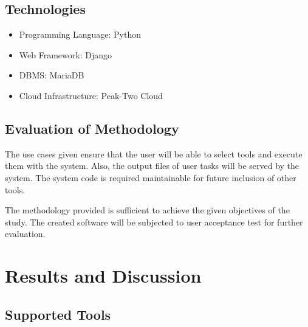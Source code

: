 	
\subsection{Technologies}
	\begin{itemize}
   		\item Programming Language: Python 
   		\item Web Framework: Django  
   		\item DBMS: MariaDB  
   		\item Cloud Infrastructure: Peak-Two Cloud 
	\end{itemize}	
	
\subsection{Evaluation of Methodology}

The use cases given ensure that the user will be able to select tools and execute them with the system. Also, the output files of user tasks will be served by the system. The system code is required maintainable for future inclusion of other tools.  

The methodology provided is sufficient to achieve the given objectives of the study. The created software will be subjected to user acceptance test for further evaluation. 

\section{Results and Discussion}

\subsection{Supported Tools}
		
